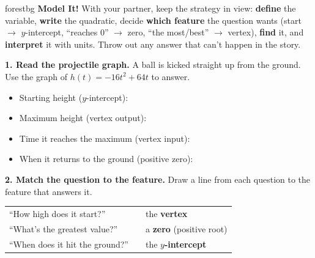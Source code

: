 \documentclass[10pt]{article}
\begin{document}

\vspace{0.08in}

\begin{headlinebox}{forestbg}
\small\textbf{Model It!} With your partner, keep the strategy in view: \textbf{define} the variable, \textbf{write}
the quadratic, decide \textbf{which feature} the question wants (start $\to$ $y$-intercept, ``reaches $0$'' $\to$
zero, ``the most/best'' $\to$ vertex), \textbf{find} it, and \textbf{interpret} it with units. Throw out any answer
that can't happen in the story.
\end{headlinebox}

\vspace{0.06in}

\begin{tcolorbox}[colback=white, colframe=black!40, title=\textbf{Tier R --- Remediate},
    fonttitle=\bfseries, arc=1.5mm, left=3mm, right=3mm, top=2mm, bottom=2mm, breakable]
\textbf{1. Read the projectile graph.} A ball is kicked straight up from the ground. Use the graph of
$h(t)=-16t^2+64t$ to answer.
\begin{center}
\end{center}
\begin{itemize}\setlength{\itemsep}{3pt}
  \item Starting height ($y$-intercept): \blank{2.0cm}
  \item Maximum height (vertex output): \blank{2.0cm}
  \item Time it reaches the maximum (vertex input): \blank{2.0cm}
  \item When it returns to the ground (positive zero): \blank{2.0cm}
\end{itemize}

\textbf{2. Match the question to the feature.} Draw a line from each question to the feature that answers it.
\begin{center}
\renewcommand{\arraystretch}{1.3}
\begin{tabularx}{0.92\linewidth}{@{}X c X@{}}
``How high does it start?''        & \qquad & the \textbf{vertex} \\
``What's the greatest value?''     & \qquad & a \textbf{zero} (positive root) \\
``When does it hit the ground?''   & \qquad & the \textbf{$y$-intercept} \\
\end{tabularx}
\end{center}


\end{tcolorbox}
\end{document}
